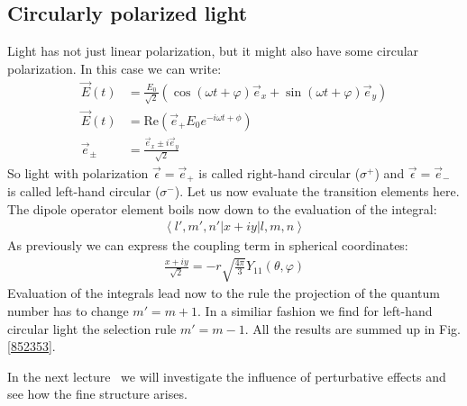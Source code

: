 \documentclass[10pt]{article}
\let\cite\citep
\providecommand\citep{\cite}
\newcommand{\bra}[1]{\ensuremath{\left\langle#1\right|}}
\newcommand{\ket}[1]{\ensuremath{\left|#1\right\rangle}}
\begin{document}
\subsection{Circularly polarized light}
Light has not just linear polarization, but it might also have some circular polarization. In this case we can write:
\begin{align}
\vec{E}(t) &= \frac{E_0}{\sqrt{2}} \left(\cos(\omega t +\varphi)\vec{e}_x + \sin(\omega t +\varphi)\vec{e}_y\right)\\
\vec{E}(t) &= \text{Re}\left(\vec{e}_+ E_0 e^{-i\omega t +\phi}\right)\\
\vec{e}_\pm &= \frac{\vec{e}_x\pm i\vec{e}_y}{\sqrt{2}}
\end{align}
So light with polarization $\vec{\epsilon} = \vec{e}_+$ is called right-hand circular ($\sigma^+$) and $\vec{\epsilon} = \vec{e}_-$ is called left-hand circular ($\sigma^-$). Let us now evaluate the transition elements here. The dipole operator element boils now down to the evaluation of the integral:
\begin{align}
\bra{l',m',n'}x+iy\ket{l,m,n}
\end{align}
As previously we can express the coupling term in spherical coordinates:
\begin{align}
\frac{x+iy}{\sqrt{2}} = -r \sqrt{\frac{4\pi}{3}}Y_{11}(\theta, \varphi)
\end{align}
Evaluation of the integrals lead now to the rule the projection of the quantum number has to change $m' = m+1$. In a similiar fashion we find for left-hand circular light the selection rule $m' = m - 1$. All the results are summed up in Fig. \ref{852353}.

In the next lecture~\cite{atoma} we will investigate the influence
of perturbative effects and see how the fine structure arises.

\FloatBarrier
\nocite{*}



\end{document}
